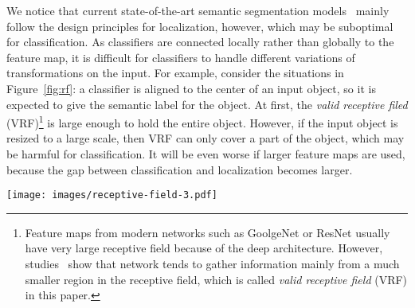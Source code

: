 \documentclass[10pt,twocolumn,letterpaper]{article}
\begin{document}
   We notice that current state-of-the-art semantic segmentation models~\cite{long2015fully,chen14semantic,noh2015learning} mainly follow the design principles for localization, however, which may be suboptimal for classification. As classifiers are connected locally rather than globally to the feature map, it is difficult for classifiers to handle different variations of transformations on the input. For example, consider the situations in Figure~\ref{fig:rf}: a classifier is aligned to the center of an input object, so it is expected to give the semantic label for the object. At first, the \emph{valid receptive filed} (VRF)\footnote{Feature maps from modern networks such as GoolgeNet or ResNet usually have very large receptive field because of the deep architecture. However, studies~\cite{zhou2014object} show that network tends to gather information mainly from a much smaller region in the receptive field, which is called \emph{valid receptive field} (VRF) in this paper.} is large enough to hold the entire object. However, if the input object is resized to a large scale, then VRF can only cover a part of the object, which may be harmful for classification. It will be even worse if larger feature maps are used, because the gap between classification and localization becomes larger. 
   \begin{figure*}[t]
      \begin{center}
         \texttt{[image: images/receptive-field-3.pdf]}
      \end{center}
      \caption{ Visualization of \emph{valid receptive field} (VRF) introduced by \cite{zhou2014object}. Regions on images show the VRF for the score map located at the center of the bird. For traditional segmentation model, even though the receptive field is as large as the input image, however, the VRF just covers the bird (A) and fails to hold the entire object if the input resized to a larger scale (B). As a comparison, our Global Convolution Network significantly enlarges the VRF (C). }
      \label{fig:rf}
   \end{figure*}
\par
\end{document}

